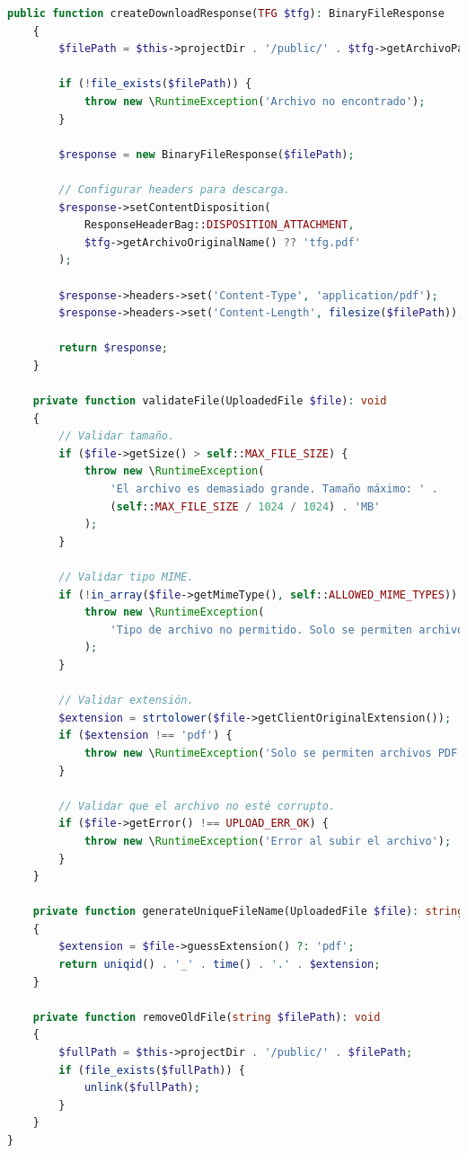 \documentclass[12pt,a4paper,oneside]{report}
\begin{document}
\begin{lstlisting}[language=PHP]
    public function createDownloadResponse(TFG $tfg): BinaryFileResponse
    {
        $filePath = $this->projectDir . '/public/' . $tfg->getArchivoPath();
        
        if (!file_exists($filePath)) {
            throw new \RuntimeException('Archivo no encontrado');
        }

        $response = new BinaryFileResponse($filePath);
        
        // Configurar headers para descarga.
        $response->setContentDisposition(
            ResponseHeaderBag::DISPOSITION_ATTACHMENT,
            $tfg->getArchivoOriginalName() ?? 'tfg.pdf'
        );

        $response->headers->set('Content-Type', 'application/pdf');
        $response->headers->set('Content-Length', filesize($filePath));

        return $response;
    }

    private function validateFile(UploadedFile $file): void
    {
        // Validar tamaño.
        if ($file->getSize() > self::MAX_FILE_SIZE) {
            throw new \RuntimeException(
                'El archivo es demasiado grande. Tamaño máximo: ' . 
                (self::MAX_FILE_SIZE / 1024 / 1024) . 'MB'
            );
        }

        // Validar tipo MIME.
        if (!in_array($file->getMimeType(), self::ALLOWED_MIME_TYPES)) {
            throw new \RuntimeException(
                'Tipo de archivo no permitido. Solo se permiten archivos PDF'
            );
        }

        // Validar extensión.
        $extension = strtolower($file->getClientOriginalExtension());
        if ($extension !== 'pdf') {
            throw new \RuntimeException('Solo se permiten archivos PDF');
        }

        // Validar que el archivo no esté corrupto.
        if ($file->getError() !== UPLOAD_ERR_OK) {
            throw new \RuntimeException('Error al subir el archivo');
        }
    }

    private function generateUniqueFileName(UploadedFile $file): string
    {
        $extension = $file->guessExtension() ?: 'pdf';
        return uniqid() . '_' . time() . '.' . $extension;
    }

    private function removeOldFile(string $filePath): void
    {
        $fullPath = $this->projectDir . '/public/' . $filePath;
        if (file_exists($fullPath)) {
            unlink($fullPath);
        }
    }
}
\end{lstlisting}
\end{document}
